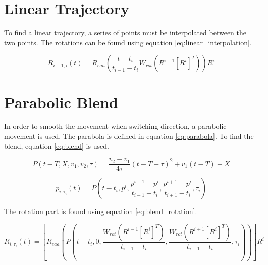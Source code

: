 \section{Linear Trajectory}

To find a linear trajectory, a series of points must be interpolated between the two points. 
The rotations can be found using equation \ref{eq:linear_interpolation}.

\begin{equation}
  R_{i-1, i}(t) = R_{eaa} \left( \frac{t-t_i}{t_{i-1} - t_i} W_{rot} (R^{i-1} [R^i]^T)\right) R^i 
  \label{eq:linear_interpolation}
\end{equation}



\section{Parabolic Blend}

In order to smooth the movement when switching direction, a parabolic movement is used.
The parabola is defined in equation \ref{eq:parabola}.
To find the blend, equation \ref{eq:blend} is used.

\begin{equation}
 P(t-T,X,v_1,v_2, \tau) = \frac{v_2 - v_1}{4 \tau} (t-T + \tau)^2 + v_1 (t-T) + X
\label{eq:parabola}
\end{equation}

\begin{equation}
 p_{i,\tau_i}(t) = P\left( t-t_i, p^i, \frac{p^{i-1} - p^i}{t_{i-1} - t_i}, \frac{p^{i+1} - p^i}{t_{i+1} - t_i}, \tau_i \right)  
\label{eq:blend}
 \end{equation}

The rotation part is found using equation \ref{eq:blend_rotation}.

\begin{equation}
R_{i,\tau_i}(t) = 
\left[ R_{eaa} 
  \left( 
    P\left( 
      t-t_i, 0, \frac{W_{rot}(R^{i-1} [R^i]^T)}{t_{i-1} - t_i}, \frac{W_{rot}(R^{i+1} [R^i]^T)}{t_{i+1} - t_i}, \tau_i
     \right) 
  \right) 
\right] R^i
 \label{eq:blend_rotation}
\end{equation}

